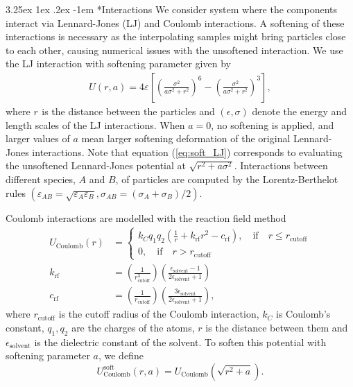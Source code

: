 \documentclass[%
onecolumn,
superscriptaddress,
nofootinbib,
amsmath,amssymb,
table
]{revtex4-2}
\makeatletter
\renewcommand\paragraph{%
  \@startsection{paragraph}{4}{\z@}%
    {3.25ex \@plus1ex \@minus.2ex}%
    {-1em}%
    {\normalfont\normalsize\bfseries}%
}
\makeatother
\begin{document}
\paragraph*{Interactions} We consider system where the components interact  via  Lennard-Jones (LJ) and Coulomb interactions. A softening of these interactions is necessary as the interpolating samples might bring particles close to each other, causing numerical issues with the unsoftened interaction. We use the LJ interaction with softening parameter\citep{BEUTLER1994529} given by 
\begin{align}
    \label{eq:soft_LJ}
    U(r,a)=4\varepsilon \left[\left(\frac{\sigma^2}{a\sigma^2+ r^2}\right)^{6}-\left(\frac{\sigma^2}{a\sigma^2+r^2}\right)^{3}\right],
\end{align}
where $r_{}$ is the distance between the particles and $(\epsilon,\sigma)$ denote the energy and length scales of the LJ interactions. When $a=0$, no softening is applied, and larger values of $a$ mean larger softening deformation of the original Lennard-Jones interactions. Note that equation (\ref{eq:soft_LJ}) corresponds to evaluating the unsoftened Lennard-Jones potential at $\sqrt{r^2 + a\sigma^2}$.  Interactions between different species, $A$ and $B$, of particles are computed by the Lorentz-Berthelot rules \citep{LorentzH.A.1881UdAd,berthelot1898melange} $(\varepsilon_{AB}=\sqrt{\varepsilon_A \varepsilon_B}, \sigma_{AB}=(\sigma_A+\sigma_B)/2)$. 

Coulomb interactions are modelled with the reaction field method \citep{tironi1995generalized}
\begin{align}
    U_{\text{Coulomb}}(r)&=
    \begin{cases} k_C{q_1q_2}\left(\frac{1}{r}+k_{\text{rf}}r^2-c_{\text{rf}}\right), \quad \text {if}  \quad r\leq r_{\text{cutoff}} \\
    0, \quad \text {if}  \quad r>r_{\text{cutoff}}
    \end{cases} \\
    k_{\text{rf}}&= \left(\frac{1}{r_\text{cutoff}^3}\right)\left(\frac{\epsilon_\text{solvent}-1}{2\epsilon_\text{solvent}+1}\right) \\
    c_{\text{rf}}&= \left(\frac{1}{r_\text{cutoff}}\right)\left(\frac{3\epsilon_\text{solvent}}{2\epsilon_\text{solvent}+1}\right),
\end{align}
where $r_\text{cutoff}$ is the cutoff radius of the Coulomb interaction, $k_C$ is Coulomb's constant, $q_1,q_2$ are the charges of the atoms, $r$ is the distance between them and $\epsilon_\text{solvent}$ 
is the dielectric constant of the solvent. To soften this potential with softening parameter $a$, we define
\begin{equation}
    \label{eq:soft_coulomb}
     U^\text{soft}_{\text{Coulomb}}(r,a)=  U_{\text{Coulomb}}(\sqrt{r^2+a}).
\end{equation}
\end{document}
